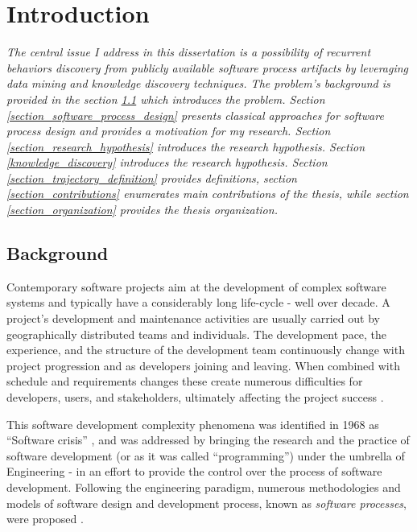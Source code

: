 \chapter{Introduction}\label{chapter_introduction}
\textit{The central issue I address in this dissertation is a possibility of recurrent behaviors 
discovery from publicly available software process artifacts by leveraging data mining and 
knowledge discovery techniques. 
The problem's background is provided in the section \ref{section_background} which introduces the problem. 
Section \ref{section_software_process_design} presents classical approaches for software process design 
and provides a motivation for my research.
Section \ref{section_research_hypothesis} introduces the research hypothesis.
Section \ref{knowledge_discovery} introduces the research hypothesis.
Section \ref{section_trajectory_definition} provides definitions, section \ref{section_contributions} 
enumerates main contributions of the thesis, while section \ref{section_organization} provides 
the thesis organization.}

%
%
\section{Background}\label{section_background}
Contemporary software projects aim at the development of complex software systems and 
typically have a considerably long life-cycle - well over decade.
A project's development and maintenance activities are usually carried out by geographically 
distributed teams and individuals. The development pace, the experience, and the structure of the 
development team continuously change with project progression and as developers joining and leaving. 
When combined with schedule and requirements changes these create numerous difficulties 
for developers, users, and stakeholders, ultimately affecting the project success \cite{citeulike:2207657}. 

This software development complexity phenomena was identified in 1968 as ``Software crisis'' 
\cite{naur_crisis_68}, and was addressed by bringing the research and the practice of software development 
(or as it was called ``programming'') under the umbrella of Engineering - in an effort to provide 
the control over the process of software development. 
Following the engineering paradigm, numerous methodologies and models of software design and development 
process, known as \textit{software processes}, were proposed \cite{citeulike:10002165}.

